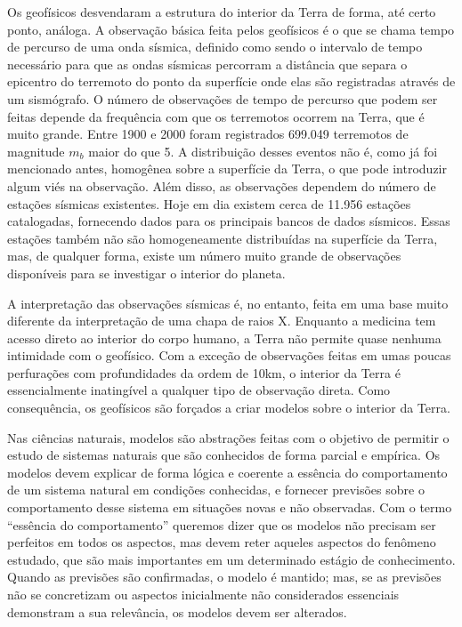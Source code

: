 \documentclass[]{book}
\theoremstyle{definition}
\theoremstyle{definition}
\theoremstyle{definition}
\theoremstyle{remark}
\begin{document}
Os geofísicos desvendaram a estrutura do interior da Terra de forma, até certo ponto, análoga. A observação básica feita pelos geofísicos é o que se chama tempo de percurso de uma onda sísmica, definido como sendo o intervalo de tempo necessário para que as ondas sísmicas percorram a distância que separa o epicentro do terremoto do ponto da superfície onde elas são registradas através de um sismógrafo. O número de observações de tempo de percurso que podem ser feitas depende da frequência com que os terremotos ocorrem na Terra, que é muito grande. Entre 1900 e 2000 foram registrados 699.049 terremotos de magnitude \(m_b\) maior do que 5. A distribuição desses eventos não é, como já foi mencionado antes, homogênea sobre a superfície da Terra, o que pode introduzir algum viés na observação. Além disso, as observações dependem do número de estações sísmicas existentes. Hoje em dia existem cerca de 11.956 estações catalogadas, fornecendo dados para os principais bancos de dados sísmicos. Essas estações também não são homogeneamente distribuídas na superfície da Terra, mas, de qualquer forma, existe um número muito grande de observações disponíveis para se investigar o interior do planeta.

A interpretação das observações sísmicas é, no entanto, feita em uma base muito diferente da interpretação de uma chapa de raios X. Enquanto a medicina tem acesso direto ao interior do corpo humano, a Terra não permite quase nenhuma intimidade com o geofísico. Com a exceção de observações feitas em umas poucas perfurações com profundidades da ordem de 10km, o interior da Terra é essencialmente inatingível a qualquer tipo de observação direta. Como consequência, os geofísicos são forçados a criar modelos sobre o interior da Terra.

Nas ciências naturais, modelos são abstrações feitas com o objetivo de permitir o estudo de sistemas naturais que são conhecidos de forma parcial e empírica. Os modelos devem explicar de forma lógica e coerente a essência do comportamento de um sistema natural em condições conhecidas, e fornecer previsões sobre o comportamento desse sistema em situações novas e não observadas. Com o termo ``essência do comportamento'' queremos dizer que os modelos não precisam ser perfeitos em todos os aspectos, mas devem reter aqueles aspectos do fenômeno estudado, que são mais importantes em um determinado estágio de conhecimento. Quando as previsões são confirmadas, o modelo é mantido; mas, se as previsões não se concretizam ou aspectos inicialmente não considerados essenciais demonstram a sua relevância, os modelos devem ser alterados.
\end{document}
